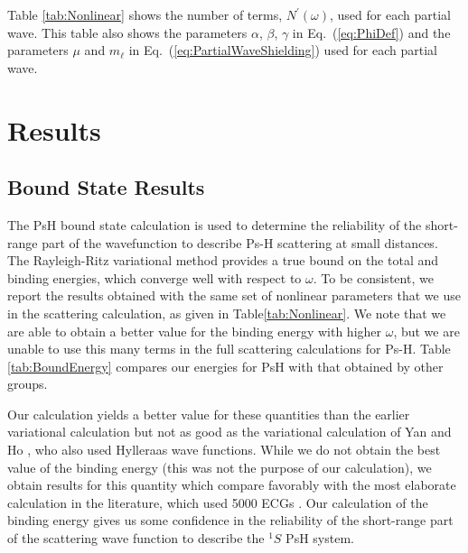 \documentclass[preprint,showpacs,showkeys,preprintnumbers,amsmath,amssymb,longbibliography,pra,aps]{revtex4-1}
\begin{document}
Table \ref{tab:Nonlinear} shows the number of terms, $N^\prime(\omega)$, used 
for each partial wave. This table also shows the parameters $\alpha$, $\beta$,
$\gamma$ in Eq.~(\ref{eq:PhiDef}) and the parameters $\mu$ and $m_\ell$ in 
Eq.~(\ref{eq:PartialWaveShielding}) used for each partial wave.


\section{Results}
\label{sec:Results}

\subsection{Bound State Results}

The PsH bound state calculation is used to determine the reliability of the 
short-range part of the wavefunction to describe Ps-H scattering at small 
distances. The Rayleigh-Ritz variational method provides a true bound on the 
total and binding energies, which converge well with respect to $\omega$. To 
be consistent, we report the results obtained with the same set of nonlinear 
parameters that we use in the scattering calculation, as given in
Table\ref{tab:Nonlinear}. We note that we are able to obtain a better value for
the binding energy with higher $\omega$, but we are unable to use this many
terms in the full scattering calculations for Ps-H. Table \ref{tab:BoundEnergy} 
compares our energies for PsH with that obtained by other groups.

Our calculation yields a better value for these quantities than the earlier 
variational calculation \cite{VanReeth2003,VanReeth2004} but not as good as 
the variational calculation of Yan and Ho \cite{Yan1999}, who also used 
Hylleraas wave functions. While we do not obtain the best value of the 
binding energy (this was not the purpose of our calculation), we obtain 
results for this quantity which compare favorably with the most elaborate 
calculation in the literature, which used 5000 ECGs \cite{Bubin2006}. Our 
calculation of the binding energy gives us some confidence in the reliability 
of the short-range part of the scattering wave function to describe the $^1S$ 
PsH system.
\end{document}
